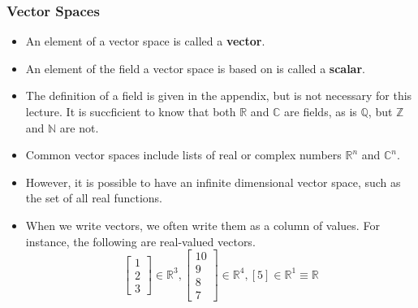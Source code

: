 \documentclass[10pt]{beamer}
\begin{document}
\begin{frame}
  \frametitle{Vector Spaces}
  \begin{itemize}
  \item An element of a vector space is called a \textbf{vector}.
  \item An element of the field a vector space is based on is called a \textbf{scalar}.
  \item The definition of a field is given in the appendix, but is not necessary for this lecture. It is succficient to know that both $\mathbb{R}$ and $\mathbb{C}$ are fields, as is $\mathbb{Q}$, but $\mathbb{Z}$ and $\mathbb{N}$ are not.
  \item Common vector spaces include lists of real or complex numbers $\mathbb{R}^n$ and $\mathbb{C}^n$.
  \item However, it is possible to have an infinite dimensional vector space, such as the set of all real functions.
  \item When we write vectors, we often write them as a column of values. For instance, the following are real-valued vectors.
    $$\left[\begin{matrix}
    1\\
    2\\
    3\end{matrix}\right]\in \mathbb{R}^3, \left[\begin{matrix}
    10\\
    9\\
    8\\
    7\end{matrix}\right]\in \mathbb{R}^4,\left[5\right] \in\mathbb{R}^1\equiv \mathbb{R}$$
  \end{itemize}
\end{frame}
\end{document}
